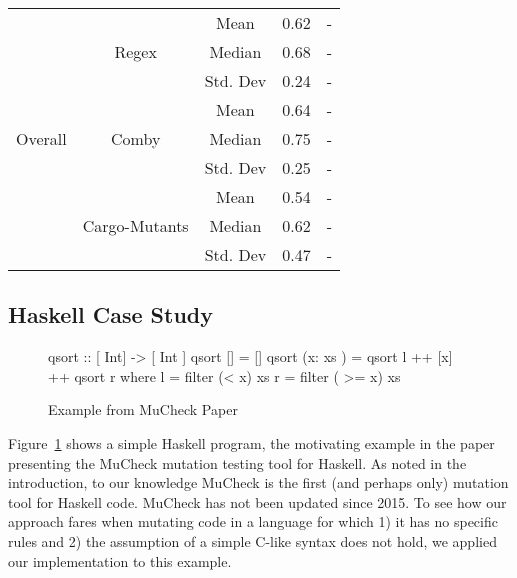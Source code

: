 \documentclass[sigconf,review, anonymous]{acmart}
\begin{document}
{\begin{table}[htbp]
{\begin{tabular}{|c|c|r|r|r|r|}
\multirow{9}{*}{Overall} & \multirow{3}{*}{Regex} & \multicolumn{2}{c|}{Mean} & 0.62  & -\\\cline{3-6}
    &   &  \multicolumn{2}{c|}{Median} & 0.68 & - \\\cline{3-6}
    &   &  \multicolumn{2}{c|}{Std. Dev} & 0.24 & - \\\cline{2-6}

 & \multirow{3}{*}{Comby} & \multicolumn{2}{c|}{Mean} & 0.64 & -\\\cline{3-6}
    &   &  \multicolumn{2}{c|}{Median} & 0.75 & - \\\cline{3-6}
    &   &  \multicolumn{2}{c|}{Std. Dev} & 0.25 & - \\\cline{2-6}

 & \multirow{3}{*}{Cargo-Mutants} & \multicolumn{2}{c|}{Mean} & 0.54 & -\\\cline{3-6}
    &   &  \multicolumn{2}{c|}{Median} & 0.62 & - \\\cline{3-6}
    &   &  \multicolumn{2}{c|}{Std. Dev} & 0.47 & - \\ \hline
    
    
\end{tabular}
}
\end{table}

\subsection{Haskell Case Study}

\begin{figure}

  \begin{code}
 qsort :: [ Int] -> [ Int ]
 qsort [] = []
 qsort (x: xs ) = qsort l ++ [x] ++ qsort r
     where l = filter (< x) xs
           r = filter ( >= x) xs
\end{code}
\caption{Example from MuCheck Paper}
\label{fig:haskell}

\end{figure}

Figure~\ref{fig:haskell} shows a simple Haskell program, the
motivating example in the paper presenting the MuCheck \cite{mucheck}
mutation testing tool for Haskell.  As noted in the introduction, to our
knowledge MuCheck is the first (and perhaps only) mutation tool for
Haskell code.  MuCheck has not been updated since 2015.
To see how our approach fares when mutating code in a language for
which 1) it has no specific rules and 2) the assumption of a simple
C-like syntax does not hold, we applied our implementation to this example.

}
\end{document}
